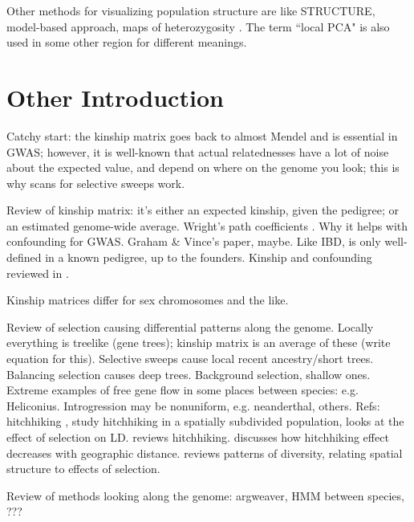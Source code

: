 \documentclass[11pt, oneside]{article}   	%
\begin{document}
Other methods for visualizing population structure are like STRUCTURE, \citep{pritchard2000inference,falush2003inference, falush2007inference,hubisz2009inferring} model-based approach, \citep{yang2012modelbased} maps of heterozygosity \citep{ramachandran2005support}. The term ``local PCA" is also used in some other region for different meanings. \citep{manjon2013diffusion,kambhatla1997dimension,weingessel2000local}



\section{Other Introduction}

Catchy start: the kinship matrix goes back to almost Mendel and is essential in GWAS;
however, it is well-known that actual relatednesses have a lot of noise about the expected value,
and depend on where on the genome you look;
this is why scans for selective sweeps work.

Review of kinship matrix: 
it's either an expected kinship, given the pedigree;
or an estimated genome-wide average.
Wright's path coefficients \citep{wright1943isolation}.
Why it helps with confounding for GWAS.
Graham \& Vince's paper, maybe.
Like IBD, is only well-defined in a known pedigree, up to the founders.
Kinship and confounding reviewed in \citet{astle2009population}.

Kinship matrices differ for sex chromosomes and the like.

Review of selection causing differential patterns along the genome.
Locally everything is treelike (gene trees);
kinship matrix is an average of these (write equation for this).
Selective sweeps cause local recent ancestry/short trees.
Balancing selection causes deep trees.
Background selection, shallow ones.
Extreme examples of free gene flow in some places between species: e.g. Heliconius.
Introgression may be nonuniform, e.g. neanderthal, others.
Refs: hitchhiking \citep{maynardsmith1974hitchhiking},
\citet{kim2011hitchhiking} study hitchhiking in a spatially subdivided population,
\citet{mcvean2007structure} looks at the effect of selection on LD.
\citet{barton2000genetic} reviews hitchhiking.
\citet{bierne2010distinctive} discusses how hitchhiking effect decreases with geographic distance.
\citet{charlesworth2003review} reviews patterns of diversity, relating spatial structure to effects of selection.

Review of methods looking along the genome:
argweaver, HMM between species, ???
\end{document}
